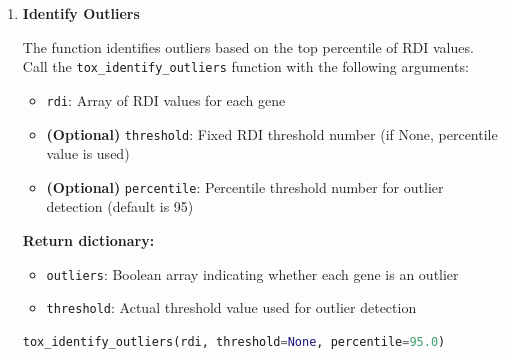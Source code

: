 \begin{enumerate}
\begin{enumerate}
\begin{itemize}
                    \item \textbf{dscale}: Array of scaling factors per family
                  \end{itemize}
                  
                  \begin{lstlisting}[language=Python, caption={Python Compute Relative Distance Index (RDI)}]
tox_compute_rdi(distances, gene_to_fam, dscale)
                  \end{lstlisting}
                  
            \item \textbf{Identify Outliers}
                  
                  The function identifies outliers based on the top percentile of RDI values.
                  Call the \texttt{tox\_identify\_outliers} function with the following arguments:
                  
                  \begin{itemize}
                    \item \texttt{rdi}: Array of RDI values for each gene
                          
                    \item \textbf{(Optional)} \texttt{threshold}: Fixed RDI threshold
                          number (if None, percentile value is used)
                          
                    \item \textbf{(Optional)} \texttt{percentile}: Percentile threshold
                          number for outlier detection (default is 95)
                  \end{itemize}
                  
                  \textbf{Return dictionary:}
                  \begin{itemize}
                    \item \texttt{outliers}: Boolean array indicating whether each gene is
                          an outlier
                          
                    \item \texttt{threshold}: Actual threshold value used for outlier detection
                  \end{itemize}
                  \begin{lstlisting}[language=Python, caption={Python Identify Outliers}]
tox_identify_outliers(rdi, threshold=None, percentile=95.0)
                  \end{lstlisting}
          \end{enumerate}
          

\end{enumerate}
